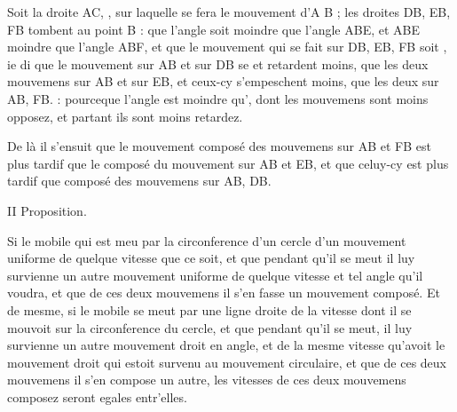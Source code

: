 \documentclass[11pt,a4paper]{article}
\begin{document}
Soit la droite  AC, , sur laquelle se fera le mouvement d'A \struck{\ill{}}  B ;  les droites DB, EB, FB tombent au point B : que l'angle  soit moindre que l'angle ABE, et ABE moindre que l'angle ABF, et que le mouvement qui se fait sur DB, EB, FB soit , ie di que le mouvement sur AB et sur DB se  et retardent moins, que les deux mouvemens sur AB et sur EB, et ceux-cy  s'empeschent moins, que les deux sur AB, FB. : pourceque l'angle  est moindre qu', dont les mouvemens sont moins opposez, et partant ils sont moins retardez.

De là il s'ensuit que le mouvement composé des mouvemens sur AB et FB est plus tardif que  le composé du mouvement sur AB et EB, et que celuy-cy est plus tardif que   composé des mouvemens sur AB, DB.


II Proposition.

Si le mobile \struck{\ill{}} qui est meu par la circonference d'un cercle d'un mouvement uniforme de quelque vitesse que ce soit, et que pendant qu'il se meut il luy survienne un autre mouvement uniforme de  quelque vitesse  et  tel angle qu'il voudra, et que de ces deux mouvemens il s'en fasse un mouvement composé. Et de mesme, si le mobile se meut par une ligne droite de la  vitesse dont il se mouvoit sur la circonference du cercle, et que pendant qu'il se meut, il luy survienne un autre mouvement droit en  angle, et de la mesme vitesse qu'avoit le mouvement droit qui estoit survenu au mouvement circulaire, et que de ces deux mouvemens il s'en compose un autre, les vitesses de ces deux mouvemens composez seront egales entr'elles.
\end{document}
